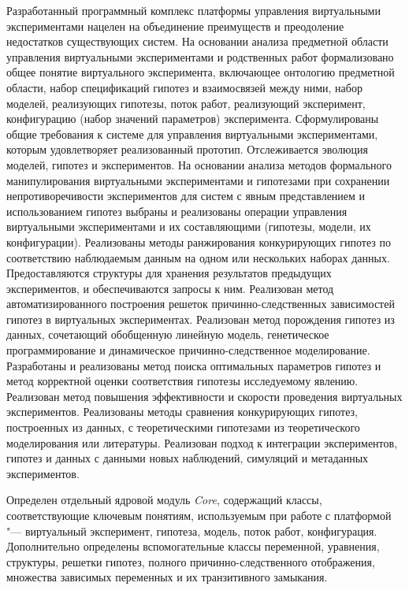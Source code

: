Разработанный программный комплекс платформы управления виртуальными экспериментами нацелен на объединение 
преимуществ и преодоление недостатков существующих систем. На основании анализа предметной области управления 
виртуальными экспериментами и родственных работ формализовано общее понятие виртуального эксперимента, включающее 
онтологию предметной области, набор спецификаций гипотез и взаимосвязей между ними, набор моделей, реализующих 
гипотезы, поток работ, реализующий эксперимент, конфигурацию (набор значений параметров) эксперимента. Сформулированы 
общие требования к системе для управления виртуальными экспериментами, которым удовлетворяет реализованный прототип. 
Отслеживается эволюция моделей, гипотез и экспериментов. На основании анализа методов формального манипулирования 
виртуальными экспериментами и гипотезами при сохранении непротиворечивости экспериментов для систем с явным 
представлением и использованием гипотез выбраны и реализованы операции управления виртуальными экспериментами и 
их составляющими (гипотезы, модели, их конфигурации). Реализованы методы ранжирования конкурирующих гипотез по 
соответствию наблюдаемым данным на одном или нескольких наборах данных. Предоставляются структуры для хранения 
результатов предыдущих экспериментов, и обеспечиваются запросы к ним. Реализован метод автоматизированного построения 
решеток причинно-следственных зависимостей гипотез в виртуальных экспериментах. Реализован метод порождения гипотез 
из данных, сочетающий обобщенную линейную модель, генетическое программирование и динамическое причинно-следственное 
моделирование. Разработаны и реализованы метод поиска оптимальных параметров гипотез и метод корректной оценки 
соответствия гипотезы исследуемому явлению. Реализован метод повышения эффективности и скорости проведения виртуальных 
экспериментов. Реализованы методы сравнения конкурирующих гипотез, построенных из данных, с теоретическими гипотезами 
из теоретического моделирования или литературы. Реализован подход к интеграции экспериментов, гипотез и данных с 
данными новых наблюдений, симуляций и метаданных экспериментов.

Определен отдельный ядровой модуль \textit{Core}, содержащий классы, соответствующие ключевым понятиям, используемым при работе 
с платформой "--- виртуальный эксперимент, гипотеза, модель, поток работ, конфигурация. Дополнительно определены 
вспомогательные классы переменной, уравнения, структуры, решетки гипотез, полного причинно-следственного отображения, 
множества зависимых переменных и их транзитивного замыкания. 

